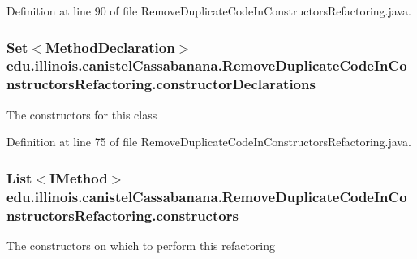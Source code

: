 Definition at line 90 of file RemoveDuplicateCodeInConstructorsRefactoring.java.

\hypertarget{classedu_1_1illinois_1_1canistelCassabanana_1_1RemoveDuplicateCodeInConstructorsRefactoring_a39607f363fde072a17c90ed499dd113b}{
\subsubsection[{constructorDeclarations}]{\setlength{\rightskip}{0pt plus 5cm}Set$<$MethodDeclaration$>$ {\bf edu.illinois.canistelCassabanana.RemoveDuplicateCodeInConstructorsRefactoring.constructorDeclarations}}}
\label{classedu_1_1illinois_1_1canistelCassabanana_1_1RemoveDuplicateCodeInConstructorsRefactoring_a39607f363fde072a17c90ed499dd113b}
The constructors for this class 

Definition at line 75 of file RemoveDuplicateCodeInConstructorsRefactoring.java.

\hypertarget{classedu_1_1illinois_1_1canistelCassabanana_1_1RemoveDuplicateCodeInConstructorsRefactoring_a9d31c4c2b04e3ed5a8450714a08f1381}{
\subsubsection[{constructors}]{\setlength{\rightskip}{0pt plus 5cm}List$<$IMethod$>$ {\bf edu.illinois.canistelCassabanana.RemoveDuplicateCodeInConstructorsRefactoring.constructors}}}
\label{classedu_1_1illinois_1_1canistelCassabanana_1_1RemoveDuplicateCodeInConstructorsRefactoring_a9d31c4c2b04e3ed5a8450714a08f1381}
The constructors on which to perform this refactoring 


